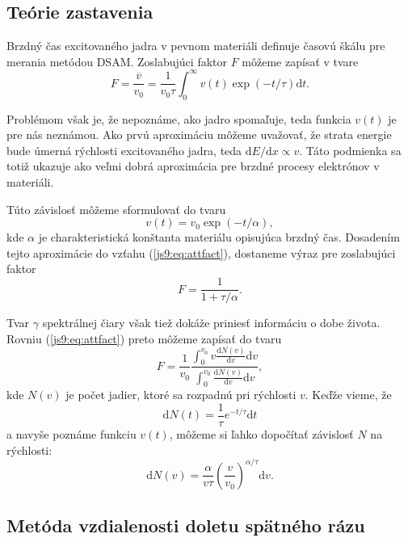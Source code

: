 \documentclass[../../main.tex]{subfiles}
\begin{document}
\subsection{Teórie zastavenia}

Brzdný čas excitovaného jadra v pevnom materiáli definuje časovú škálu pre merania metódou DSAM. Zoslabujúci faktor $F$ môžeme zapísať v tvare
\begin{equation}
F=\dfrac{\overline{v}}{v_0}=\dfrac{1}{v_0\tau}\int_0^{\infty}v(t)\exp(-t/\tau)\mathrm{d}t.
\label{js9:eq:attfact}
\end{equation}

Problémom však je, že nepoznáme, ako jadro spomaľuje, teda funkcia $v(t)$ je pre nás neznámou. Ako prvú aproximáciu môžeme uvažovať, že strata energie bude úmerná rýchlosti excitovaného jadra, teda $\mathrm{d}E/\mathrm{d}x \propto v$. Táto podmienka sa totiž ukazuje ako veľmi dobrá aproximácia pre brzdné procesy elektrónov v materiáli.

Túto závislosť môžeme sformulovať do tvaru
\begin{equation}
v(t)=v_0\exp(-t/\alpha),
\end{equation}
kde $\alpha$ je charakteristická konštanta materiálu opisujúca brzdný čas. Dosadením tejto aproximácie do vzťahu (\ref{js9:eq:attfact}), dostaneme výraz pre zoslabujúci faktor
\begin{equation}
F=\dfrac{1}{1+\tau/\alpha}.
\end{equation}

Tvar $\gamma$ spektrálnej čiary však tiež dokáže priniesť informáciu o dobe života. Rovniu (\ref{js9:eq:attfact}) preto môžeme zapísať do tvaru
\begin{equation}
F=\dfrac{1}{v_0}\dfrac{\int_0^{v_0}v\frac{\mathrm{d}N(v)}{\mathrm{d}v}\mathrm{d}v}{\int_0^{v_0}\frac{\mathrm{d}N(v)}{\mathrm{d}v}\mathrm{d}v},
\end{equation}
kde $N(v)$ je počet jadier, ktoré sa rozpadnú pri rýchlosti $v$. Keďže vieme, že 
\begin{equation}
\mathrm{d}N(t)=\frac{1}{\tau}e^{-t/\tau}\mathrm{d}t
\end{equation}
a navyše poznáme funkciu $v(t)$, môžeme si ľahko dopočítať závislosť $N$ na rýchlosti:
\begin{equation}
\mathrm{d}N(v)=\dfrac{\alpha}{v\tau}\left(\dfrac{v}{v_0}\right)^{\alpha/\tau}\mathrm{d}v.
\end{equation}

\subsection{Metóda vzdialenosti doletu spätného rázu}
\end{document}
